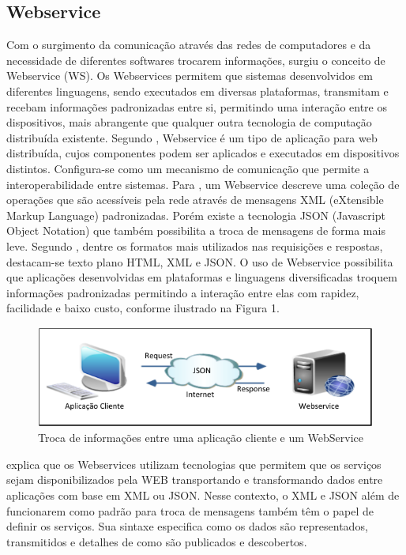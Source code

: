 \documentclass[12pt]{article}
\begin{document}
\subsection{Webservice}

Com o surgimento da comunicação através das redes de computadores e da necessidade
de diferentes softwares trocarem informações, surgiu o conceito de Webservice (WS).
Os Webservices permitem que sistemas desenvolvidos em diferentes linguagens,
sendo executados em diversas plataformas, transmitam e recebam informações
padronizadas entre si, permitindo uma interação entre os dispositivos, mais abrangente
que qualquer outra tecnologia de computação distribuída existente.
Segundo \cite{kalin:09}, Webservice é um tipo de aplicação para web distribuída,
cujos componentes podem ser aplicados e executados em dispositivos distintos.
Configura-se como um mecanismo de comunicação que permite a interoperabilidade
entre sistemas. Para \cite{kreger:01}, um Webservice descreve uma coleção de operações
que são acessíveis pela rede através de mensagens XML (eXtensible Markup Language)
padronizadas. Porém existe a tecnologia JSON (Javascript Object Notation) que
também possibilita a troca de mensagens de forma mais leve. Segundo \cite{sandoval:09}, dentre os
formatos mais utilizados nas requisições e respostas, destacam-se texto plano
HTML, XML e JSON. O uso de Webservice
possibilita que aplicações desenvolvidas em plataformas e linguagens diversificadas
troquem informações padronizadas permitindo a interação entre elas com rapidez,
facilidade e baixo custo, conforme ilustrado na Figura 1.

\begin{figure}[ht]
	\centering
	\includegraphics[width=.8\textwidth]{figura1.png}
	\caption{Troca de informações entre uma aplicação cliente e um WebService}
	\label{fig:exampleFigura1}
\end{figure}

\cite{souza04} explica que os Webservices utilizam tecnologias que permitem que
os serviços sejam disponibilizados pela WEB transportando e transformando dados
entre aplicações com base em XML ou JSON. Nesse contexto, o XML e JSON além de
funcionarem como padrão para troca de mensagens também têm o papel de definir os
serviços. Sua sintaxe especifica como os dados são representados, transmitidos e
detalhes de como são publicados e descobertos.
\end{document}
